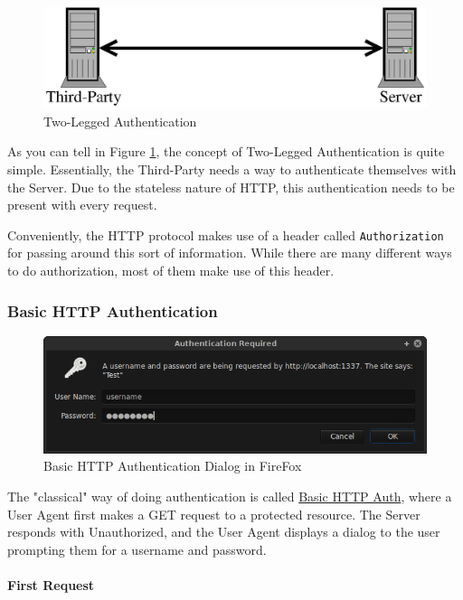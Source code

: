 \documentclass{book}
\begin{document}
\begin{figure}[!htb]
\centering
\includegraphics[scale=.6]{images/two-legged.eps}
\caption{Two-Legged Authentication}
\label{fig:twolegged}
\end{figure}

As you can tell in Figure \ref{fig:twolegged}, the concept of Two-Legged Authentication is quite simple. Essentially, the Third-Party needs a way to authenticate themselves with the Server. Due to the stateless nature of HTTP, this authentication needs to be present with every request.

Conveniently, the HTTP protocol makes use of a header called \texttt{Authorization} for passing around this sort of information. While there are many different ways to do authorization, most of them make use of this header.

\subsubsection{Basic HTTP Authentication}

\begin{figure}[ht!]
\centering
\includegraphics[width=120mm]{images/basic-http-auth.png}
\caption{Basic HTTP Authentication Dialog in FireFox}
\label{fig:basichhtpauth}
\end{figure}

The "classical" way of doing authentication is called \href{https://tools.ietf.org/html/rfc2617}{Basic HTTP Auth}, where a User Agent first makes a GET request to a protected resource. The Server responds with Unauthorized, and the User Agent displays a dialog to the user prompting them for a username and password.

\paragraph{\textbf{First Request}}
\end{document}
